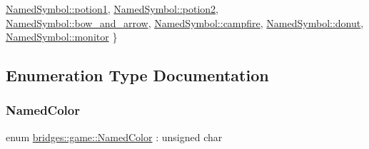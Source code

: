 \begin{DoxyCompactItemize}
\hyperlink{namespacebridges_1_1game_ab9a19c7ab6e2ebac2f95180e21733487a67b1a5c9879a387216a22605b098bafb}{Named\+Symbol\+::potion1}, 
\hyperlink{namespacebridges_1_1game_ab9a19c7ab6e2ebac2f95180e21733487a105dacaa87101b9e3022b0e1135765de}{Named\+Symbol\+::potion2}, 
\hyperlink{namespacebridges_1_1game_ab9a19c7ab6e2ebac2f95180e21733487a025c8fae72270652db15def6b2765c67}{Named\+Symbol\+::bow\+\_\+and\+\_\+arrow}, 
\newline
\hyperlink{namespacebridges_1_1game_ab9a19c7ab6e2ebac2f95180e21733487aa0511348829522ed5ae18ae493d56cc3}{Named\+Symbol\+::campfire}, 
\hyperlink{namespacebridges_1_1game_ab9a19c7ab6e2ebac2f95180e21733487a81bdd90fd4bc5a1c9b7b603014ff1388}{Named\+Symbol\+::donut}, 
\hyperlink{namespacebridges_1_1game_ab9a19c7ab6e2ebac2f95180e21733487a08b5411f848a2581a41672a759c87380}{Named\+Symbol\+::monitor}
 \}
\end{DoxyCompactItemize}


\subsection{Enumeration Type Documentation}
\mbox{\label{namespacebridges_1_1game_afaa832a4322b25b6a4ebfba832f10f26}} 
\subsubsection{\texorpdfstring{Named\+Color}{NamedColor}}
{\footnotesize\ttfamily enum \hyperlink{namespacebridges_1_1game_afaa832a4322b25b6a4ebfba832f10f26}{bridges\+::game\+::\+Named\+Color} \+: unsigned char\hspace{0.3cm}{\ttfamily [strong]}}


